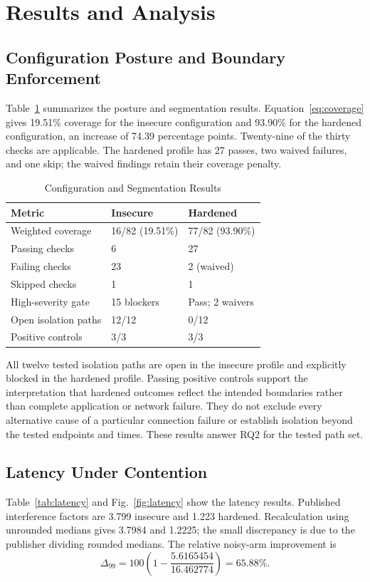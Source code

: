 \documentclass[conference,letterpaper]{IEEEtran}
\begin{document}
\section{Results and Analysis}
\subsection{Configuration Posture and Boundary Enforcement}
Table~\ref{tab:audit} summarizes the posture and segmentation results. Equation~\eqref{eq:coverage} gives 19.51\% coverage for the insecure configuration and 93.90\% for the hardened configuration, an increase of 74.39 percentage points. Twenty-nine of the thirty checks are applicable. The hardened profile has 27 passes, two waived failures, and one skip; the waived findings retain their coverage penalty.

\begin{table}[t]
\caption{Configuration and Segmentation Results}
\label{tab:audit}
\centering
\footnotesize
\renewcommand{\arraystretch}{1.15}
\begin{tabular}{@{}p{}p{}p{}@{}}
\toprule
Metric & Insecure & Hardened \\ \midrule
Weighted coverage & 16/82 (19.51\%) & 77/82 (93.90\%) \\
Passing checks & 6 & 27 \\
Failing checks & 23 & 2 (waived) \\
Skipped checks & 1 & 1 \\
High-severity gate & 15 blockers & Pass; 2 waivers \\
Open isolation paths & 12/12 & 0/12 \\
Positive controls & 3/3 & 3/3 \\
\bottomrule
\end{tabular}
\end{table}

All twelve tested isolation paths are open in the insecure profile and explicitly blocked in the hardened profile. Passing positive controls support the interpretation that hardened outcomes reflect the intended boundaries rather than complete application or network failure. They do not exclude every alternative cause of a particular connection failure or establish isolation beyond the tested endpoints and times. These results answer RQ2 for the tested path set.

\subsection{Latency Under Contention}
Table~\ref{tab:latency} and Fig.~\ref{fig:latency} show the latency results. Published interference factors are 3.799 insecure and 1.223 hardened. Recalculation using unrounded medians gives 3.7984 and 1.2225; the small discrepancy is due to the publisher dividing rounded medians. The relative noisy-arm improvement is
\begin{equation}
\Delta_{99}=100\left(1-\frac{5.6165454}{16.462774}\right)=65.88\%.
\label{eq:reduction}
\end{equation}
\end{document}
